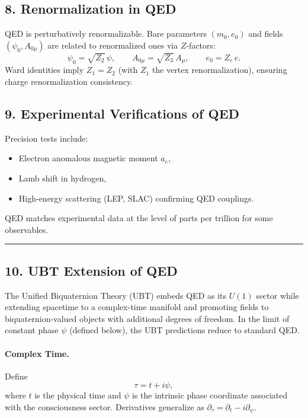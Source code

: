 \subsection*{8. Renormalization in QED}
QED is perturbatively renormalizable. Bare parameters $(m_0,e_0)$ and fields $(\psi_0,A_{0\mu})$ are related to renormalized ones via $Z$-factors:
\begin{equation}
\psi_0 = \sqrt{Z_2}\,\psi, \qquad A_{0\mu}=\sqrt{Z_3}\,A_\mu,\qquad e_0=Z_e\,e.
\end{equation}
Ward identities imply $Z_1=Z_2$ (with $Z_1$ the vertex renormalization), ensuring charge renormalization consistency.

\subsection*{9. Experimental Verifications of QED}
Precision tests include:
\begin{itemize}
\item Electron anomalous magnetic moment $a_e$,
\item Lamb shift in hydrogen,
\item High-energy scattering (LEP, SLAC) confirming QED couplings.
\end{itemize}
QED matches experimental data at the level of parts per trillion for some observables.

\bigskip
\hrule
\bigskip

\subsection*{10. UBT Extension of QED}
The Unified Biquaternion Theory (UBT) embeds QED as its $U(1)$ sector while extending spacetime to a complex-time manifold and promoting fields to biquaternion-valued objects with additional degrees of freedom. In the limit of constant phase $\psi$ (defined below), the UBT predictions reduce to standard QED.

\paragraph{Complex Time.} Define
\begin{equation}
\tau = t + i \psi ,
\end{equation}
where $t$ is the physical time and $\psi$ is the intrinsic phase coordinate associated with the consciousness sector. Derivatives generalize as $\partial_\tau = \partial_t - i \partial_\psi$.

